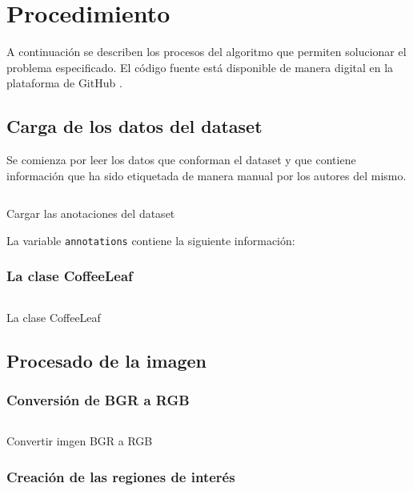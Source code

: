 \chapter{Procedimiento}
A continuación se describen los procesos del algoritmo que permiten solucionar el problema especificado. El código fuente está disponible de manera digital en la plataforma de GitHub \cite{LindermanDgz}.

\section{Carga de los datos del dataset}
Se comienza por leer los datos que conforman el dataset y que contiene información que ha sido etiquetada de manera manual por los autores del mismo.

\begin{listing}[!ht]
\inputminted{python}{code_listings/load_dataset.py}
\caption{Cargar las anotaciones del dataset}
\label{code:load_dataset}
\end{listing}

La variable \texttt{annotations} contiene la siguiente información:

\subsection{La clase CoffeeLeaf}
\begin{listing}[!ht]
\inputminted{python}{code_listings/coffee_leaf.py}
\caption{La clase CoffeeLeaf}
\label{code:coffee_leaf}
\end{listing}

\section{Procesado de la imagen}

\subsection{Conversión de BGR a RGB}
\begin{listing}[!ht]
\inputminted{python}{code_listings/bgr_to_rgb.py}
\caption{Convertir imgen BGR a RGB}
\label{code:bgr_to_rgb}
\end{listing}

\subsection{Creación de las regiones de interés}

